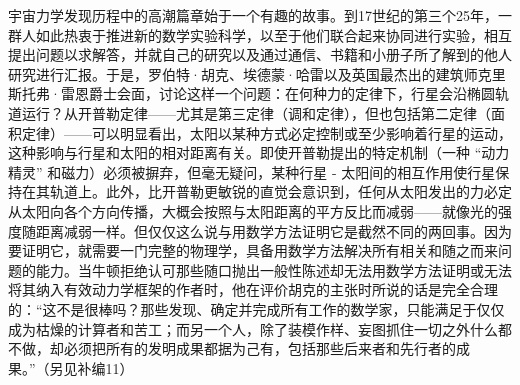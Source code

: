 \documentclass{article}
\begin{document}
宇宙力学发现历程中的高潮篇章始于一个有趣的故事。到17世纪的第三个25年，一群人如此热衷于推进新的数学实验科学，以至于他们联合起来协同进行实验，相互提出问题以求解答，并就自己的研究以及通过通信、书籍和小册子所了解到的他人研究进行汇报。于是，罗伯特·胡克、埃德蒙·哈雷以及英国最杰出的建筑师克里斯托弗·雷恩爵士会面，讨论这样一个问题：在何种力的定律下，行星会沿椭圆轨道运行？从开普勒定律——尤其是第三定律（调和定律），但也包括第二定律（面积定律）——可以明显看出，太阳以某种方式必定控制或至少影响着行星的运动，这种影响与行星和太阳的相对距离有关。即使开普勒提出的特定机制（一种 “动力精灵” 和磁力）必须被摒弃，但毫无疑问，某种行星 - 太阳间的相互作用使行星保持在其轨道上。此外，比开普勒更敏锐的直觉会意识到，任何从太阳发出的力必定从太阳向各个方向传播，大概会按照与太阳距离的平方反比而减弱——就像光的强度随距离减弱一样。但仅仅这么说与用数学方法证明它是截然不同的两回事。因为要证明它，就需要一门完整的物理学，具备用数学方法解决所有相关和随之而来问题的能力。当牛顿拒绝认可那些随口抛出一般性陈述却无法用数学方法证明或无法将其纳入有效动力学框架的作者时，他在评价胡克的主张时所说的话是完全合理的：“这不是很棒吗？那些发现、确定并完成所有工作的数学家，只能满足于仅仅成为枯燥的计算者和苦工；而另一个人，除了装模作样、妄图抓住一切之外什么都不做，却必须把所有的发明成果都据为己有，包括那些后来者和先行者的成果。”（另见补编11） \\
\end{document}
